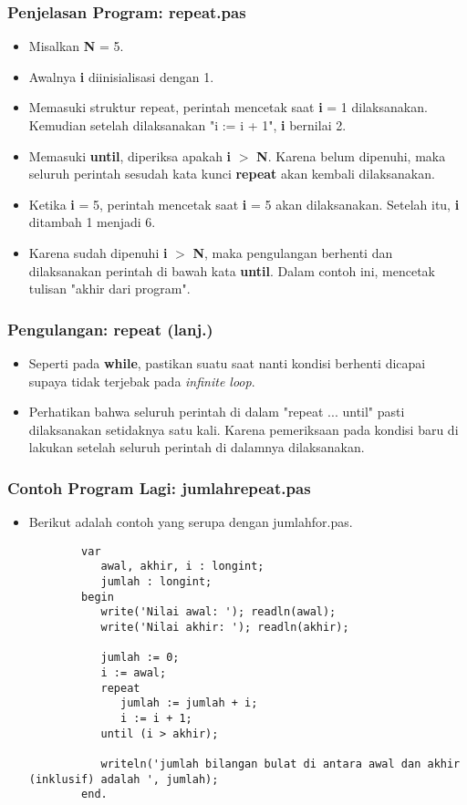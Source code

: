\documentclass{beamer}
\begin{document}
\begin{frame}
\frametitle{Penjelasan Program: repeat.pas}
\begin{itemize}
	\item Misalkan \textbf{N} = 5.
	\item Awalnya \textbf{i} diinisialisasi dengan 1.
	\item Memasuki struktur repeat, perintah mencetak saat \textbf{i} = 1 dilaksanakan. Kemudian setelah dilaksanakan "i := i + 1", \textbf{i} bernilai 2.
	\item Memasuki \textbf{until}, diperiksa apakah \textbf{i} $>$ \textbf{N}. Karena belum dipenuhi, maka seluruh perintah sesudah kata kunci \textbf{repeat} akan kembali dilaksanakan.
	\item Ketika \textbf{i} = 5, perintah mencetak saat \textbf{i} = 5 akan dilaksanakan. Setelah itu, \textbf{i} ditambah 1 menjadi 6.
	\item Karena sudah dipenuhi \textbf{i} $>$ \textbf{N}, maka pengulangan berhenti dan dilaksanakan perintah di bawah kata \textbf{until}. Dalam contoh ini, mencetak tulisan "akhir dari program".
\end{itemize}
\end{frame}

\begin{frame}
\frametitle{Pengulangan: repeat (lanj.)}
\begin{itemize}
	\item Seperti pada \textbf{while}, pastikan suatu saat nanti kondisi berhenti dicapai supaya tidak terjebak pada \textit{infinite loop}.
	\item Perhatikan bahwa seluruh perintah di dalam "repeat ... until" \alert{pasti} dilaksanakan setidaknya satu kali. Karena pemeriksaan pada kondisi baru di lakukan setelah seluruh perintah di dalamnya dilaksanakan. 
\end{itemize}
\end{frame}

\begin{frame}[fragile]
\frametitle{Contoh Program Lagi: jumlahrepeat.pas}
\begin{itemize}
	\item Berikut adalah contoh yang serupa dengan jumlahfor.pas.
	\begin{lstlisting}
		var
		   awal, akhir, i : longint;
		   jumlah : longint;
		begin
		   write('Nilai awal: '); readln(awal);
		   write('Nilai akhir: '); readln(akhir);
		
		   jumlah := 0;
		   i := awal;
		   repeat
		      jumlah := jumlah + i;
		      i := i + 1;
		   until (i > akhir);
		
		   writeln('jumlah bilangan bulat di antara awal dan akhir (inklusif) adalah ', jumlah);
		end.
	\end{lstlisting}
\end{itemize}
\end{frame}
\end{document}
